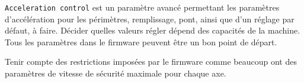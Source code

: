 \texttt{Acceleration control} est un paramètre avancé permettant les paramètres d'accélération pour les périmètres, remplissage, pont, ainsi que d'un réglage par défaut, à faire. Décider quelles valeurs régler dépend des capacités de la machine. Tous les paramètres dans le firmware peuvent être un bon point de départ.

Tenir compte des restrictions imposées par le firmware comme beaucoup ont des paramètres de vitesse de sécurité maximale pour chaque axe.

